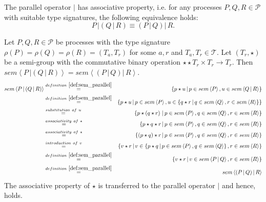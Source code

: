 \begin{theorem}
\label{thm:associativity_parallel}
The parallel operator $|$ has associative property, i.e. for any processes $P, Q, R \in \mathcal{P}$ with suitable type signatures, the following equivalence holds:
\begin{equation*}
  P \,| \left( Q \,|\, R \right) \equiv \left( P \,|\, Q \right) |\, R.
\end{equation*}
\end{theorem}

\begin{myproof}
Let $P, Q, R \in \mathcal{P}$ be processes with the type signature $\rho \left( P \right) = \rho \left( Q \right) = \rho \left( R \right) = \left( T_a, T_r \right)$ for some $a, r$ and $T_a, T_r \in \mathcal{T}$. Let $\left( T_r, \star \right)$ be a semi-group with the commutative binary operation $\star \star T_r \times T_r \to T_r$. Then $sem \left\langle P \,| \left( Q \,|\, R \right) \right\rangle = sem \left\langle \left( P \,|\, Q \right) |\, R \right\rangle$.
\begin{eqnarray*}
  sem \left\langle P \,| \left( Q \,|\, R \right) \right\rangle & \overset{\defref{def:sem_parallel}}{=} & \left\{ p \star u \,|\, p \in sem \left\langle P \right\rangle, u \in sem \left\langle Q \,|\, R \right\rangle \right\} \\
  & \overset{\defref{def:sem_parallel}}{=} & \left\{ p \star u \,|\, p \in sem \left\langle P \right\rangle, u \in \left\{q \star r \,|\, q \in sem \left\langle Q \right\rangle, r \in sem \left\langle R \right\rangle \right\} \right\} \\
  & \overset{substitution \ of \ u}{=} & \left\{ p \star \left( q \star r \right) \,|\, p \in sem \left\langle P \right\rangle, q \in sem \left\langle Q \right\rangle, r \in sem \left\langle R \right\rangle \right\} \\
  & \overset{associativity \ of \  \star}{=} & \left\{ p \star q \star r \,|\, p \in sem \left\langle P \right\rangle, q \in sem \left\langle Q \right\rangle, r \in sem \left\langle R \right\rangle \right\} \\
  & \overset{associativity \ of \  \star}{=} & \left\{ \left( p \star q \right) \star r \,|\, p \in sem \left\langle P \right\rangle, q \in sem \left\langle Q \right\rangle, r \in sem \left\langle R \right\rangle \right\} \\
  & \overset{introduction \ of \ v}{=} & \left\{ v \star r \,|\, v \in \left\{ p \star q \,|\, p \in sem \left\langle P \right\rangle, q \in sem \left\langle Q \right\rangle \right\}, r \in sem \left\langle R \right\rangle \right\} \\
  & \overset{\defref{def:sem_parallel}}{=} & \left\{ v \star r \,|\, v \in sem \left\langle P \,|\, Q \right\rangle, r \in sem \left\langle R \right\rangle \right\} \\
  & \overset{\defref{def:sem_parallel}}{=} & sem \left\langle \left( P \,|\, Q \right) |\, R \right\rangle
\end{eqnarray*}
The associative property of $\star$ is transferred to the parallel operator $|$ and hence,  holds.


\end{myproof}

